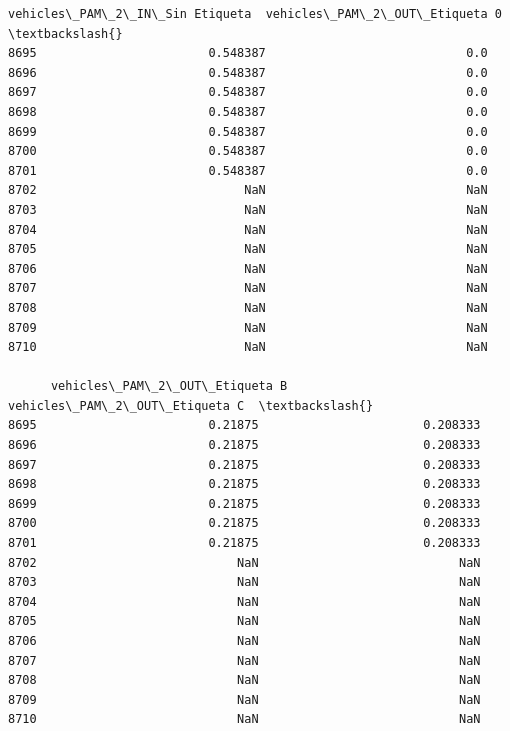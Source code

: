 \documentclass[11pt]{article}
\begin{document}
\begin{tcolorbox}[breakable, size=fbox, boxrule=.5pt, pad at break*=1mm, opacityfill=0]
\begin{Verbatim}[commandchars=\\\{\}]
      vehicles\_PAM\_2\_IN\_Sin Etiqueta  vehicles\_PAM\_2\_OUT\_Etiqueta 0  \textbackslash{}
8695                        0.548387                            0.0
8696                        0.548387                            0.0
8697                        0.548387                            0.0
8698                        0.548387                            0.0
8699                        0.548387                            0.0
8700                        0.548387                            0.0
8701                        0.548387                            0.0
8702                             NaN                            NaN
8703                             NaN                            NaN
8704                             NaN                            NaN
8705                             NaN                            NaN
8706                             NaN                            NaN
8707                             NaN                            NaN
8708                             NaN                            NaN
8709                             NaN                            NaN
8710                             NaN                            NaN

      vehicles\_PAM\_2\_OUT\_Etiqueta B  vehicles\_PAM\_2\_OUT\_Etiqueta C  \textbackslash{}
8695                        0.21875                       0.208333
8696                        0.21875                       0.208333
8697                        0.21875                       0.208333
8698                        0.21875                       0.208333
8699                        0.21875                       0.208333
8700                        0.21875                       0.208333
8701                        0.21875                       0.208333
8702                            NaN                            NaN
8703                            NaN                            NaN
8704                            NaN                            NaN
8705                            NaN                            NaN
8706                            NaN                            NaN
8707                            NaN                            NaN
8708                            NaN                            NaN
8709                            NaN                            NaN
8710                            NaN                            NaN


\end{Verbatim}
\end{tcolorbox}
\end{document}
